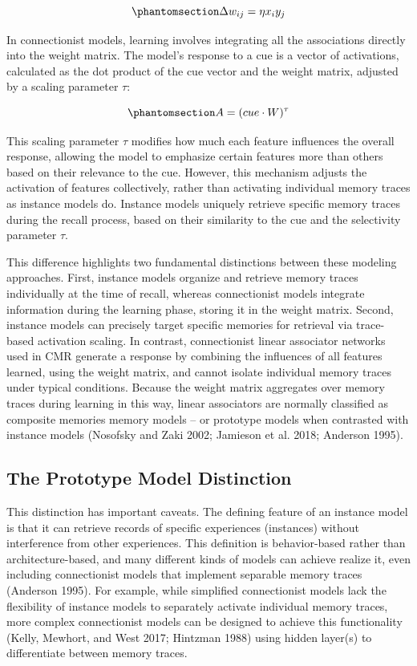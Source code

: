 \documentclass[
  letterpaper,
  11pt,
  english,
  singlespacing,
  headsepline]{MastersDoctoralThesis}
\begin{document}
\begin{equation}\phantomsection\label{eq-intro5}{
\Delta w_{ij} = \eta x_i y_j
}\end{equation}

In connectionist models, learning involves integrating all the
associations directly into the weight matrix. The model's response to a
cue is a vector of activations, calculated as the dot product of the cue
vector and the weight matrix, adjusted by a scaling parameter \(\tau\):

\begin{equation}\phantomsection\label{eq-intro6}{
A = (cue \cdot W)^{\tau}
}\end{equation}

This scaling parameter \(\tau\) modifies how much each feature
influences the overall response, allowing the model to emphasize certain
features more than others based on their relevance to the cue. However,
this mechanism adjusts the activation of features collectively, rather
than activating individual memory traces as instance models do. Instance
models uniquely retrieve specific memory traces during the recall
process, based on their similarity to the cue and the selectivity
parameter \(\tau\).

This difference highlights two fundamental distinctions between these
modeling approaches. First, instance models organize and retrieve memory
traces individually at the time of recall, whereas connectionist models
integrate information during the learning phase, storing it in the
weight matrix. Second, instance models can precisely target specific
memories for retrieval via trace-based activation scaling. In contrast,
connectionist linear associator networks used in CMR generate a response
by combining the influences of all features learned, using the weight
matrix, and cannot isolate individual memory traces under typical
conditions. Because the weight matrix aggregates over memory traces
during learning in this way, linear associators are normally classified
as composite memories memory models -- or prototype models when
contrasted with instance models (Nosofsky and Zaki 2002; Jamieson et al.
2018; Anderson 1995).

\subsection{The Prototype Model
Distinction}\label{the-prototype-model-distinction}

This distinction has important caveats. The defining feature of an
instance model is that it can retrieve records of specific experiences
(instances) without interference from other experiences. This definition
is behavior-based rather than architecture-based, and many different
kinds of models can achieve realize it, even including connectionist
models that implement separable memory traces (Anderson 1995). For
example, while simplified connectionist models lack the flexibility of
instance models to separately activate individual memory traces, more
complex connectionist models can be designed to achieve this
functionality (Kelly, Mewhort, and West 2017; Hintzman 1988) using
hidden layer(s) to differentiate between memory traces.
\end{document}
